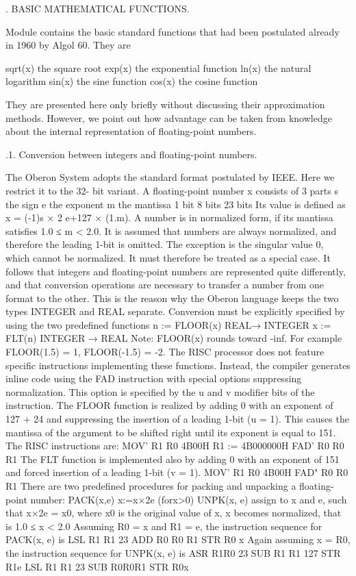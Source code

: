 . BASIC MATHEMATICAL FUNCTIONS.

Module  contains the basic standard functions that had been postulated already in 1960 by Algol 60. They are

sqrt(x) the square root
exp(x) the exponential function
ln(x) the natural logarithm
sin(x) the sine function
cos(x) the cosine function

They are presented here only briefly without discussing their approximation methods. However, we point out how advantage can be taken from knowledge about the internal representation of floating-point numbers.

.1. Conversion between integers and floating-point numbers.

The Oberon System adopts the standard format postulated by IEEE. Here we restrict it to the 32- bit variant. A floating-point number x consists of 3 parts
s the sign
e the exponent m the mantissa
1 bit
8 bits 23 bits
Its value is defined as x = (-1)s × 2 e+127 × (1.m). A number is in normalized form, if its mantissa satisfies 1.0 ≤ m < 2.0. It is assumed that numbers are always normalized, and therefore the leading 1-bit is omitted. The exception is the singular value 0, which cannot be normalized. It must therefore be treated as a special case.
It follows that integers and floating-point numbers are represented quite differently, and that conversion operations are necessary to transfer a number from one format to the other. This is the reason why the Oberon language keeps the two types INTEGER and REAL separate. Conversion must be explicitly specified by using the two predefined functions
n := FLOOR(x) REAL→ INTEGER x := FLT(n) INTEGER → REAL
Note: FLOOR(x) rounds toward -inf. For example FLOOR(1.5) = 1, FLOOR(-1.5) = -2.
The RISC processor does not feature specific instructions implementing these functions. Instead, the compiler generates inline code using the FAD instruction with special options suppressing normalization. This option is specified by the u and v modifier bits of the instruction.
The FLOOR function is realized by adding 0 with an exponent of 127 + 24 and suppressing the insertion of a leading 1-bit (u = 1). This causes the mantissa of the argument to be shifted right until its exponent is equal to 151. The RISC instructions are:
MOV' R1 R0 4B00H R1 := 4B000000H FAD' R0 R0 R1
The FLT function is implemented also by adding 0 with an exponent of 151 and forced insertion of a leading 1-bit (v = 1).
MOV' R1 R0 4B00H FAD" R0 R0 R1
There are two predefined procedures for packing and unpacking a floating-point number:
PACK(x,e) x:=x×2e (forx>0)
UNPK(x, e) assign to x and e, such that x×2e = x0, where x0 is the original value of x,
x becomes normalized, that is 1.0 ≤ x < 2.0
Assuming R0 = x and R1 = e, the instruction sequence for PACK(x, e) is LSL R1 R1 23
ADD R0 R0 R1 STR R0 x
Again assuming x = R0, the instruction sequence for UNPK(x, e) is ASR R1R0 23
SUB R1 R1 127 STR R1e
LSL R1 R1 23 SUB R0R0R1 STR R0x

